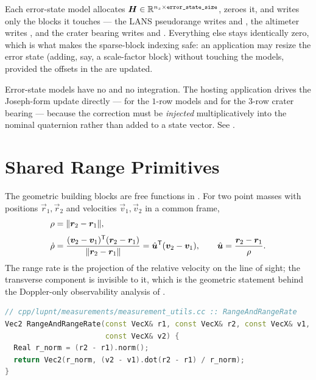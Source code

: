 Each error-state model allocates
$\bm{H} \in \mathbb{R}^{n_z \times \texttt{error\_state\_size}}$, zeroes it,
and writes only the blocks it touches --- the LANS pseudorange writes
 and , the altimeter writes , and the
crater bearing writes  and . Everything else stays
identically zero, which is what makes the sparse-block indexing safe: an
application may resize the error state (adding, say, a scale-factor block)
without touching the models, provided the offsets in the  are
updated.

\begin{lupntnote}
  Error-state models have no  and no 
  integration. The hosting application drives the Joseph-form update directly
  ---  for the $1$-row models and
   for the $3$-row crater bearing --- because
  the correction must be \emph{injected} multiplicatively into the nominal
  quaternion rather than added to a state vector. See
  .
\end{lupntnote}

\section{Shared Range Primitives}
\label{sec:meas-primitives}

The geometric building blocks are free functions in
. For two point masses with
positions $\vec{r}_1, \vec{r}_2$ and velocities $\vec{v}_1, \vec{v}_2$ in a
common frame,
\begin{align}
  \rho &= \lVert \bm{r}_2 - \bm{r}_1 \rVert,
  \label{eq:meas-range} \\[3pt]
  \dot{\rho}
   &= \frac{(\bm{v}_2 - \bm{v}_1)^{\mathsf{T}}(\bm{r}_2 - \bm{r}_1)}
           {\lVert \bm{r}_2 - \bm{r}_1 \rVert}
    = \hat{\bm{u}}^{\mathsf{T}} (\bm{v}_2 - \bm{v}_1),
  \qquad
  \hat{\bm{u}} = \frac{\bm{r}_2 - \bm{r}_1}{\rho}.
  \label{eq:meas-rangerate}
\end{align}
The range rate is the projection of the relative velocity on the line of sight;
the transverse component is invisible to it, which is the geometric statement
behind the Doppler-only observability analysis of
\citet{coimbra2025endurance}.

\begin{lstlisting}[language=cpp, caption={Range and range-rate in one pass.},
  label={lst:meas-rrr}]
// cpp/lupnt/measurements/measurement_utils.cc :: RangeAndRangeRate
Vec2 RangeAndRangeRate(const VecX& r1, const VecX& r2, const VecX& v1,
                       const VecX& v2) {
  Real r_norm = (r2 - r1).norm();
  return Vec2(r_norm, (v2 - v1).dot(r2 - r1) / r_norm);
}
\end{lstlisting}

